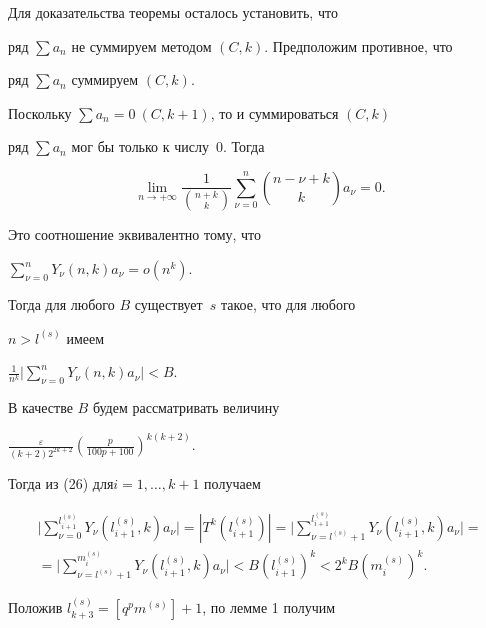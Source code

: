 Для доказательства теоремы осталось установить, что 


ряд $\sum a_n$ не суммируем методом $(C, k)$. Предположим противное, что


ряд $\sum a_n$ суммируем $(C, k)$.


Поскольку $\sum a_n=0 \ (C, k+1)$, то и суммироваться $(C, k)$ 


ряд $\sum a_n$ мог бы только к числу~0. Тогда


$$


\lim_{n \to+\infty}\frac{1}{{n+k \choose k}}


\sum_{\nu=0}^n {n-\nu+k \choose k} a_{\nu}=0.


$$


Это соотношение эквивалентно тому, что


$\sum\limits_{\nu=0}^n Y_{\nu} (n, k) a_{\nu}=o(n^k)$.


Тогда для любого $B$ существует~$s$ такое, что для любого


$n>l^{(s)}$ имеем 


$\frac{1}{n^k}\Big| \sum\limits_{\nu=0}^n Y_{\nu} (n, k) a_{\nu} \Big|<B$.





В качестве $B$ будем рассматривать величину 


$\frac{\varepsilon}{(k+2) 2^{2k+2}}(\frac{p}{100p+100} )^{k(k+2)}$. 


Тогда из (26) для\linebreak $i=1,\dotsc,k+1$ получаем


\begin{multline*}


\bigg|\sum_{\nu=0}^{l_{i+1}^{(s)}} Y_{\nu} (l_{i+1}^{(s)}, k) a_{\nu} \bigg|=


|T^k (l_{i+1}^{(s)})|=\bigg|\sum_{\nu=l^{(s)}+1}^{l_{i+1}^{(s)}}


Y_{\nu} (l_{i+1}^{(s)}, k) a_{\nu} \bigg|=\\


%


=\bigg|\sum_{\nu=l^{(s)}+1}^{m_{i}^{(s)}}


Y_{\nu} (l_{i+1}^{(s)}, k) a_{\nu} \bigg|<


B (l_{i+1}^{(s)})^k<2^k B (m_{i}^{(s)})^k.


\end{multline*}


Положив $l_{k+3}^{(s)}=[q^p m^{(s)}]+1$, по лемме 1 получим 


$$


